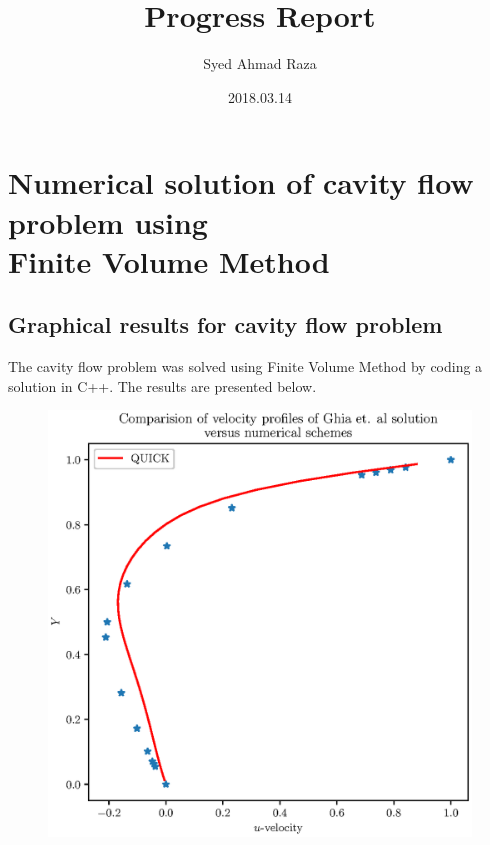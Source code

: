 \documentclass[12pt,a4paper,fleqn]{article}
\title{Progress Report}
\author{Syed Ahmad Raza}
\date{2018.03.14}
\begin{document}
\maketitle
\pagebreak

\section{Numerical solution of cavity flow problem using\\
    Finite Volume Method}

\subsection{Graphical results for cavity flow problem}

The cavity flow problem was solved using Finite Volume Method by coding a solution in C++. The results are presented below.

\begin{figure}[H]
    \centering
    \includegraphics[width=\textwidth]{n,xy=40_qk_cavityFlowY.eps}
    \label{fig:n,xy=40_qk_cavityFlowY.eps}
\end{figure}
\end{document}
